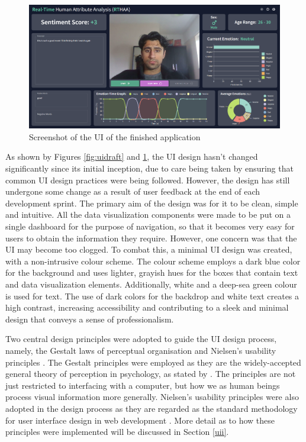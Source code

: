 \documentclass[12pt, a4paper]{article}
\newcommand{\np}
    {
    \vskip 0.4cm
    }
\begin{document}
\begin{figure}[H]
    \centering
    \includegraphics[scale=0.36]{images/webappFE13H.png}
    \caption{Screenshot of the UI of the finished application}
    \label{fig:webappHss}
\end{figure}

As shown by Figures \ref{fig:uidraft} and \ref{fig:webappHss}, the UI design hasn't changed significantly since its initial inception, due to care being taken by ensuring that common UI design practices were being followed. However, the design has still undergone some change as a result of user feedback at the end of each development sprint. The primary aim of the design was for it to be clean, simple and intuitive. All the data visualization components were made to be put on a single dashboard for the purpose of navigation, so that it becomes very easy for users to obtain the information they require. However, one concern was that the UI may become too clogged. To combat this, a minimal UI design was created, with a non-intrusive colour scheme. The colour scheme employs a dark blue color for the background and uses lighter, grayish hues for the boxes that contain text and data visualization elements. Additionally, white and a deep-sea green colour is used for text. The use of dark colors for the backdrop and white text creates a high contrast, increasing accessibility and contributing to a sleek and minimal design that conveys a sense of professionalism. 
\np
Two central design principles were adopted to guide the UI design process, namely, the Gestalt laws of perceptual organisation \citep{todorovic2008gestalt} and Nielsen's usability principles \citep{nielsen1994usability}. The Gestalt principles were employed as they are the widely-accepted general theory of perception in psychology, as stated by \cite{mather2006foundations}. The principles are not just restricted to interfacing with a computer, but how we as human beings process visual information more generally. Nielsen's usability principles were also adopted in the design process as they are regarded as the standard methodology for user interface design in web development \citep{uineilson}. More detail as to how these principles were implemented will be discussed in Section \ref{uii}.
\end{document}
